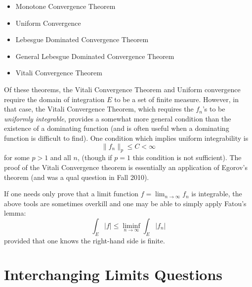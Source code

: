 \documentclass[answers]{exam}
\begin{document}
\begin{questions}
\begin{itemize}
  \item Monotone Convergence Theorem
  \item Uniform Convergence
  \item Lebesgue Dominated Convergence Theorem
  \item General Lebesgue Dominated Convergence Theorem
  \item Vitali Convergence Theorem
\end{itemize}

Of these theorems, the Vitali Convergence Theorem and Uniform convergence
require the domain of integration $E$ to be a set of finite measure. However, in that case, the Vitali
Convergence Theorem, which requires the $f_{n}$'s to be \textit{uniformly integrable}, provides a somewhat more general condition than the existence of a dominating function (and is often useful when a dominating function is difficult to find).
One condition which implies uniform integrability is 
\begin{equation*}
  \|f_{n}\|_{p}\leq C <\infty
\end{equation*}
for some $p>1$ and all $n$, (though if $p=1$ this condition is not sufficient). The proof of the Vitali Convergence theorem is essentially an application of Egorov's theorem (and was a qual question in Fall 2010).

If one needs only prove that a limit function $f = \lim_{n\to\infty} f_n$ is integrable, the above tools are sometimes overkill and one may be able to simply apply Fatou's lemma:
\begin{equation*}
  \int_{E} |f| \leq  \liminf_{n\to\infty}\int_{E} |f_{n}|
\end{equation*}
provided that one knows the right-hand side is finite.






\newpage
\section{Interchanging Limits Questions}


\end{questions}
\end{document}
